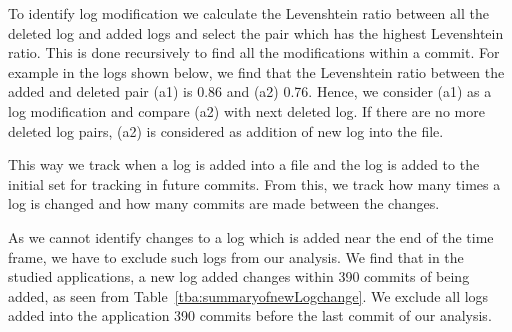 To identify log modification we calculate the Levenshtein ratio between all the deleted log and added logs and select the pair which has the highest Levenshtein ratio. This is done recursively to find all the modifications within a commit. For example in the logs shown below, we find that the Levenshtein ratio between the added and deleted pair (a1) is 0.86 and (a2) 0.76. Hence, we consider (a1) as a log modification and compare (a2) with next deleted log. If there are no more deleted log pairs, (a2) is considered as addition of new log into the file. 

This way we track when a log is added into a file and the log is added to the initial set for tracking in future commits. From this, we track how many times a log is changed and how many commits are made between the changes. 

As we cannot identify changes to a log which is added near the end of the time frame, we have to exclude such logs from our analysis. We find that in the studied applications, a new log added changes within 390 commits of being added, as seen from Table~\ref{tba:summaryofnewLogchange}. We exclude all logs added into the application 390 commits before the last commit of our analysis. 






